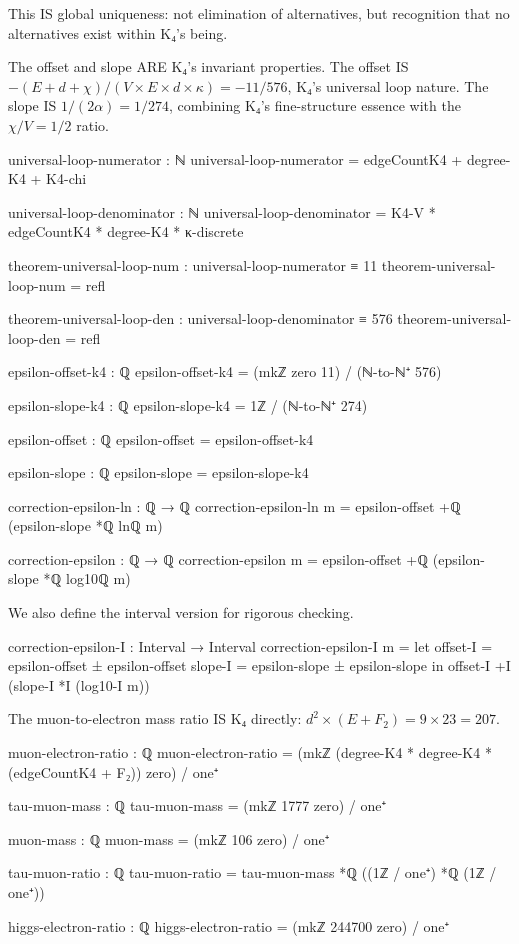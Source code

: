 \documentclass[11pt,a4paper]{book}
\begin{document}
This IS global uniqueness: not elimination of alternatives, but recognition that no alternatives exist within K₄'s being.

The offset and slope ARE K₄'s invariant properties. The offset IS $-(E + d + \chi)/(V \times E \times d \times \kappa) = -11/576$, K₄'s universal loop nature. The slope IS $1/(2\alpha) = 1/274$, combining K₄'s fine-structure essence with the $\chi/V = 1/2$ ratio.

\begin{code}
universal-loop-numerator : ℕ
universal-loop-numerator = edgeCountK4 + degree-K4 + K4-chi

universal-loop-denominator : ℕ
universal-loop-denominator = K4-V * edgeCountK4 * degree-K4 * κ-discrete

theorem-universal-loop-num : universal-loop-numerator ≡ 11
theorem-universal-loop-num = refl

theorem-universal-loop-den : universal-loop-denominator ≡ 576
theorem-universal-loop-den = refl

epsilon-offset-k4 : ℚ
epsilon-offset-k4 = (mkℤ zero 11) / (ℕ-to-ℕ⁺ 576)

epsilon-slope-k4 : ℚ
epsilon-slope-k4 = 1ℤ / (ℕ-to-ℕ⁺ 274)

epsilon-offset : ℚ
epsilon-offset = epsilon-offset-k4

epsilon-slope : ℚ  
epsilon-slope = epsilon-slope-k4

correction-epsilon-ln : ℚ → ℚ
correction-epsilon-ln m = epsilon-offset +ℚ (epsilon-slope *ℚ lnℚ m)

correction-epsilon : ℚ → ℚ
correction-epsilon m = epsilon-offset +ℚ (epsilon-slope *ℚ log10ℚ m)
\end{code}

We also define the interval version for rigorous checking.

\begin{code}
correction-epsilon-I : Interval → Interval
correction-epsilon-I m = 
  let offset-I = epsilon-offset ± epsilon-offset
      slope-I  = epsilon-slope ± epsilon-slope
  in offset-I +I (slope-I *I (log10-I m))
\end{code}

The muon-to-electron mass ratio IS K₄ directly: $d^2 \times (E + F_2) = 9 \times 23 = 207$.

\begin{code}
muon-electron-ratio : ℚ
muon-electron-ratio = (mkℤ (degree-K4 * degree-K4 * (edgeCountK4 + F₂)) zero) / one⁺

tau-muon-mass : ℚ
tau-muon-mass = (mkℤ 1777 zero) / one⁺

muon-mass : ℚ
muon-mass = (mkℤ 106 zero) / one⁺

tau-muon-ratio : ℚ
tau-muon-ratio = tau-muon-mass *ℚ ((1ℤ / one⁺) *ℚ (1ℤ / one⁺))

higgs-electron-ratio : ℚ
higgs-electron-ratio = (mkℤ 244700 zero) / one⁺
\end{code}
\end{document}
